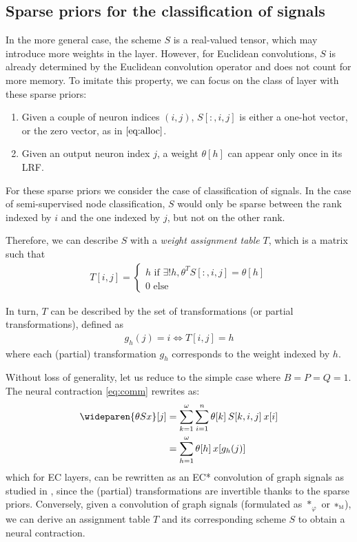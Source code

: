 \subsection{Sparse priors for the classification of signals}
\label{sec:sparse}

In the more general case, the scheme $S$ is a real-valued tensor, which may introduce more weights in the layer. However, for Euclidean convolutions, $S$ is already determined by the Euclidean convolution operator and does not count for more memory. To imitate this property, we can focus on the class of layer with these sparse priors:
\begin{enumerate}
  \item Given a couple of neuron indices $(i,j)$, $S[:,i,j]$ is either a one-hot vector, or the zero vector, as in $\eqref{eq:alloc}$.
  \item Given an output neuron index $j$, a weight $\theta[h]$ can appear only once in its LRF.
\end{enumerate}

\begin{remark}
For these sparse priors we consider the case of classification of signals. In the case of semi-supervised node classification, $S$ would only be sparse between the rank indexed by $i$ and the one indexed by $j$, but not on the other rank.
\end{remark}

Therefore, we can describe $S$ with a \emph{weight assignment table} $T$, which is a matrix such that
\begin{gather}
T[i,j] = \begin{cases}h \text{ if } \exists! h, \theta^T S[:,i,j] = \theta[h]\\ 0 \text{ else}\end{cases}
\end{gather}

In turn, $T$ can be described by the set of transformations (or partial transformations), defined as
\begin{gather}
g_h(j) = i \Leftrightarrow T[i,j] = h
\end{gather}
where each (partial) transformation $g_h$ corresponds to the weight indexed by $h$.

Without loss of generality, let us reduce to the simple case where $B=P=Q=1$. The neural contraction \eqref{eq:comm} rewrites as:
\begin{align}
\wideparen{\theta Sx}[j] & = \displaystyle \sum_{k=1}^\omega \sum_{i=1}^n \theta[k] \h{2} S[k,i,j] \h{2} x[i]\\
                         & = \displaystyle \sum_{h=1}^\omega \theta[h] \h{2} x[g_h(j)]%
\end{align}
which for EC layers, can be rewritten as an EC* convolution of graph signals as studied in , since the (partial) transformations are invertible thanks to the sparse priors. Conversely, given a convolution of graph signals (formulated as $\ast_\varphi$ or $\ast_{\operatorname{\textsc{m}}}$), we can derive an assignment table $T$ and its corresponding scheme $S$ to obtain a neural contraction.

